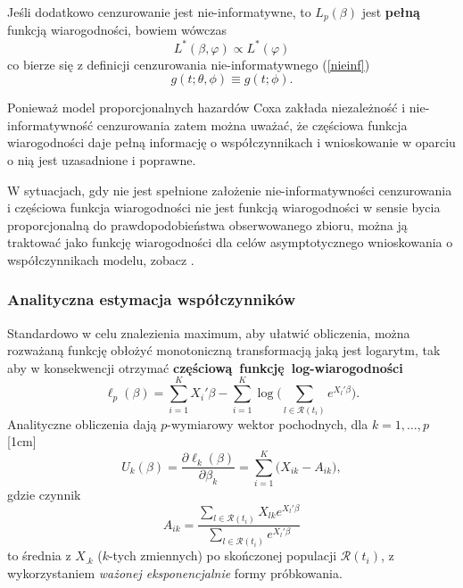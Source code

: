 Jeśli dodatkowo cenzurowanie jest nie-informatywne, to $L_p(\beta)$ jest \textbf{pełną} funkcją wiarogodności, bowiem wówczas $$L^{*}(\beta,\varphi)\propto L^{*}(\varphi)$$ co bierze się z definicji cenzurowania nie-informatywnego (\ref{nieinf}) $$g(t;\theta, \phi) \equiv g(t;\phi).$$

Ponieważ model proporcjonalnych hazardów Coxa zakłada niezależność i nie-informatywność cenzurowania zatem można uważać, że częściowa funkcja wiarogodności daje pełną informację o współczynnikach i wnioskowanie w oparciu o nią jest uzasadnione i poprawne.

W sytuacjach, gdy nie jest spełnione założenie nie-informatywności cenzurowania i częściowa funkcja wiarogodności nie jest funkcją wiarogodności w sensie bycia proporcjonalną do prawdopodobieństwa obserwowanego zbioru, można ją traktować jako funkcję wiarogodności dla celów asymptotycznego wnioskowania o współczynnikach modelu, zobacz \cite{ther}.


\subsubsection{Analityczna estymacja współczynników}
Standardowo w celu znalezienia maximum, aby ułatwić obliczenia, można rozważaną funkcję obłożyć monotoniczną transformacją jaką jest logarytm, tak aby w konsekwencji otrzymać \textbf{częściową~funkcję~log-wiarogodności}
\begin{equation}
\ell_p(\beta) = \sum\limits_{i=1}^{K}X_i'\beta - \sum\limits_{i=1}^{K}\log\Big(\sum\limits_{l\in \mathscr{R}(t_i)}^{}e^{X_l'\beta}\Big).
\end{equation}
Analityczne obliczenia dają $p$-wymiarowy wektor pochodnych, dla $k=1,\dots,p$
[1cm]
\begin{equation}\label{score}
U_k(\beta)=\dfrac{\partial\ell_k(\beta)}{\partial\beta_k}=\sum\limits_{i=1}^{K}\Big(X_{ik}-A_{ik}\Big),
\end{equation}
gdzie czynnik
\begin{equation}
A_{ik} = \dfrac{\sum\limits_{l\in \mathscr{R}(t_i)}^{} X_{lk} e^{X_l'\beta}}{\sum\limits_{l\in \mathscr{R}(t_i)}^{} e^{X_l'\beta}}
\end{equation}
to średnia z $X_{.k}$ ($k$-tych zmiennych) po skończonej populacji $\mathscr{R}(t_i)$, z wykorzystaniem \textit{ważonej eksponencjalnie} formy próbkowania.

